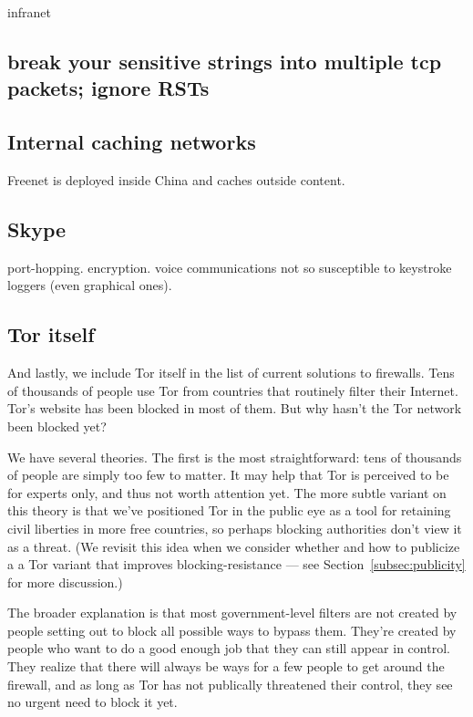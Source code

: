 \documentclass{llncs}
\begin{document}
infranet

\subsection{break your sensitive strings into multiple tcp packets;
ignore RSTs}

\subsection{Internal caching networks}

Freenet is deployed inside China and caches outside content.

\subsection{Skype}

port-hopping. encryption. voice communications not so susceptible to
keystroke loggers (even graphical ones).


\subsection{Tor itself}

And lastly, we include Tor itself in the list of current solutions
to firewalls. Tens of thousands of people use Tor from countries that
routinely filter their Internet. Tor's website has been blocked in most
of them. But why hasn't the Tor network been blocked yet?

We have several theories. The first is the most straightforward: tens of
thousands of people are simply too few to matter. It may help that Tor is
perceived to be for experts only, and thus not worth attention yet. The
more subtle variant on this theory is that we've positioned Tor in the
public eye as a tool for retaining civil liberties in more free countries,
so perhaps blocking authorities don't view it as a threat. (We revisit
this idea when we consider whether and how to publicize a a Tor variant
that improves blocking-resistance --- see Section~\ref{subsec:publicity}
for more discussion.)

The broader explanation is that most government-level filters are not
created by people setting out to block all possible ways to bypass
them. They're created by people who want to do a good enough job that
they can still appear in control. They realize that there will always
be ways for a few people to get around the firewall, and as long as Tor
has not publically threatened their control, they see no urgent need to
block it yet.
\end{document}

